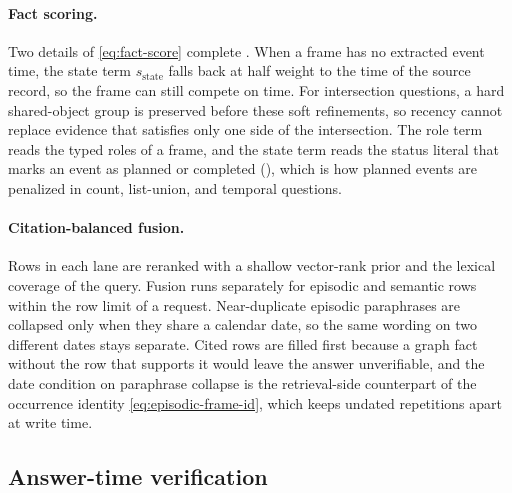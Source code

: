\paragraph{Fact scoring.}
Two details of \eqref{eq:fact-score} complete . When a
frame has no extracted event time, the state term \(s_{\mathrm{state}}\) falls
back at half weight to the time of the source record, so the frame can still
compete on time. For intersection questions, a hard shared-object group is preserved before
these soft refinements, so recency cannot replace evidence that satisfies only
one side of the intersection. The role term reads the typed roles of a frame,
and the state term reads the status literal that marks an event as planned or
completed (), which is how planned events are penalized in count,
list-union, and temporal questions.

\paragraph{Citation-balanced fusion.}
Rows in each lane are reranked with a shallow vector-rank prior and the lexical
coverage of the query. Fusion runs separately for episodic and semantic rows
within the row limit of a request. Near-duplicate episodic paraphrases
are collapsed only when they share a calendar date, so the same wording on two
different dates stays separate. Cited rows are filled first because a graph
fact without the row that supports it would leave the answer unverifiable, and
the date condition on paraphrase collapse is the retrieval-side counterpart of
the occurrence identity \eqref{eq:episodic-frame-id}, which keeps undated
repetitions apart at write time.

\subsection{Answer-time verification}
\label{app:method-verification}

